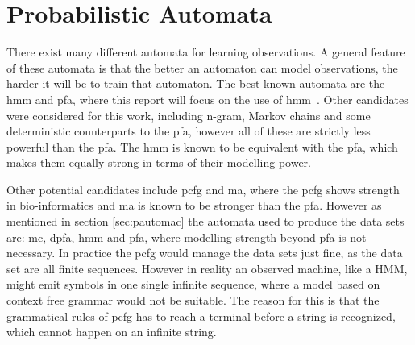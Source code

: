 \section{Probabilistic Automata}
There exist many different automata for learning observations. A general feature of these automata is that the better an automaton can model observations, the harder it will be to train that automaton. The best known automata are the \gls{hmm} and \gls{pfa}, where this report will focus on the use of \gls{hmm}~\cite{pautomacTR}.
Other candidates were considered for this work, including n-gram, Markov chains and some deterministic counterparts to the \gls{pfa}, however all of these are strictly less powerful than the \gls{pfa}. The \gls{hmm} is known to be equivalent with the \gls{pfa}, which makes them equally strong in terms of their modelling power.

Other potential candidates include \gls{pcfg} and \gls{ma}, where the \gls{pcfg} shows strength in bio-informatics and \gls{ma} is known to be stronger than the \gls{pfa}. However as mentioned in section \ref{sec:pautomac} the automata used to produce the data sets are: \gls{mc}, \gls{dpfa}, \gls{hmm} and \gls{pfa}, where modelling strength beyond \gls{pfa} is not necessary. In practice the \gls{pcfg} would manage the data sets just fine, as the data set are all finite sequences. However in reality an observed machine, like a HMM, might emit symbols in one single infinite sequence, where a model based on context free grammar would not be suitable. The reason for this is that the grammatical rules of \gls{pcfg} has to reach a terminal before a string is recognized, which cannot happen on an infinite string.
